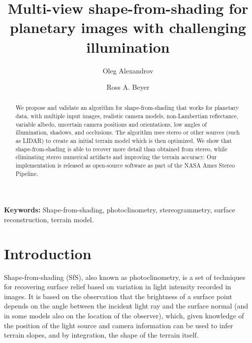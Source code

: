 \documentclass[12pt,oneside]{article}
\begin{document}
\title{Multi-view shape-from-shading for planetary images with
   challenging illumination}

 \author[1]{\rm Oleg Alexandrov}
 \author[1,2]{\rm Ross A. Beyer}



\maketitle

\begin{acronym}
\end{acronym}

\begin{abstract}
  We propose and validate an algorithm for shape-from-shading that works
  for planetary data, with multiple input images, realistic camera
  models, non-Lambertian reflectance, variable albedo, uncertain camera
  positions and orientations, low angles of illumination, shadows, and
  occlusions. The algorithm uses stereo or other sources (such as LIDAR)
  to create an initial terrain model which is then optimized. We show
  that shape-from-shading is able to recover more detail than
  obtained from stereo, while eliminating stereo numerical artifacts and
  improving the terrain accuracy. Our implementation is released as
  open-source software as part of the NASA Ames Stereo Pipeline.
\end{abstract}

{\bf Keywords:} Shape-from-shading, photoclinometry, stereogrammetry,
surface reconstruction, terrain model.

\section{Introduction}

Shape-from-shading (SfS), also known as photoclinometry, is a set of
techniques for recovering surface relief based on variation in light
intensity recorded in images. It is based on the observation that the
brightness of a surface point depends on the angle between the incident
light ray and the surface normal (and in some models also on the
location of the observer), which, given knowledge of the position of the
light source and camera information can be used to infer terrain slopes,
and by integration, the shape of the terrain itself.
\end{document}
